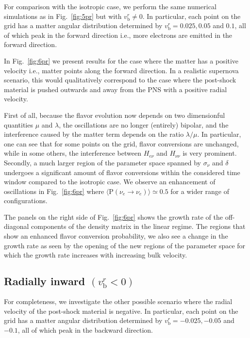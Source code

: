 \documentclass[aps, prd, 10pt, twocolumn, superscriptaddress, noshowpacs, preprintnumbers, longbibliography, groupedaddress, footinbib, bibnotes]{revtex4-1}
\newcommand{\vbr}{v_{\mathrm{b}}^{r}}
\begin{document}
For comparison with the isotropic case, we perform the same numerical simulations as in Fig.~\ref{fig:5pr} but with $\vbr \neq 0$. In particular, each point on the grid has a matter angular distribution determined by $\vbr = 0.025, 0.05$ and $0.1$, all of which peak in the forward direction i.e., more electrons are emitted in the forward direction.

In Fig.~\ref{fig:6pr} we present results for the case where the matter has a positive velocity i.e., matter points along the forward direction. In a realistic supernova scenario, this would qualitatively correspond to the case where the post-shock material is pushed outwards and away from the PNS with a positive radial velocity.

First of all, because the flavor evolution now depends on two dimensionful quantities $\mu$ and $\lambda$, the oscillations are no longer (entirely) bipolar, and the interference caused by the matter term depends on the ratio $\lambda/\mu$. In particular, one can see that for some points on the grid, flavor conversions are unchanged, while in some others, the interference between $H_{e \nu}$ and $H_{\nu\nu}$ is very prominent. Secondly, a much larger region of the parameter space spanned by $\sigma_{\nu}$ and $\delta$ undergoes a significant amount of flavor conversions within the considered time window compared to the isotropic case. We observe an enhancement of oscillations in Fig.~\ref{fig:6pr} where $\langle \mathrm{P}(\nu_{e}\rightarrow \nu_{e})\rangle \simeq 0.5$ for a wider range of configurations. 

The panels on the right side of Fig.~\ref{fig:6pr} shows the growth rate of the off-diagonal components of the density matrix in the linear regime. The regions that show an enhanced flavor conversion probability, we also see a change in the growth rate as seen by the opening of the new regions of the parameter space for which the growth rate increases with increasing bulk velocity.




\subsection{Radially inward $(\vbr < 0)$}


For completeness, we investigate the other possible scenario where the radial velocity of the post-shock material is negative. In particular, each point on the grid has a matter angular distribution determined by $\vbr = -0.025, -0.05$ and $-0.1$, all of which peak in the backward direction.
\end{document}
